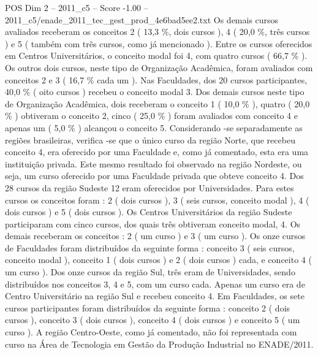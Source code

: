 \begin{textsample}{POS Dim 2 – 2011\_c5 – Score -1.00 – 2011\_c5/enade\_2011\_tec\_gest\_prod\_4e6bad5ee2.txt}
Os demais cursos avaliados receberam os conceitos 2 ( 13,3 \%, dois cursos ), 4 ( 20,0 \%, três cursos ) e 5 ( também com três cursos, como já mencionado ).
Entre os cursos oferecidos em Centros Universitários, o conceito modal foi 4, com quatro cursos ( 66,7 \% ).
Os outros dois cursos, neste tipo de Organização Acadêmica, foram avaliados com conceitos 2 e 3 ( 16,7 \% cada um ).
Nas Faculdades, dos 20 cursos participantes, 40,0 \% ( oito cursos ) recebeu o conceito modal 3.
Dos demais cursos neste tipo de Organização Acadêmica, dois receberam o conceito 1 ( 10,0 \% ), quatro ( 20,0 \% ) obtiveram o conceito 2, cinco ( 25,0 \% ) foram avaliados com conceito 4 e apenas um ( 5,0 \% ) alcançou o conceito 5.
Considerando -se separadamente as regiões brasileiras, verifica -se que o único curso da região Norte, que recebeu conceito 4, era oferecido por uma Faculdade e, como já comentado, esta era uma instituição privada.
Este mesmo resultado foi observado na região Nordeste, ou seja, um curso oferecido por uma Faculdade privada que obteve conceito 4.
Dos 28 cursos da região Sudeste 12 eram oferecidos por Universidades.
Para estes cursos os conceitos foram : 2 ( dois cursos ), 3 ( seis cursos, conceito modal ), 4 ( dois cursos ) e 5 ( dois cursos ).
Os Centros Universitários da região Sudeste participaram com cinco cursos, dos quais três obtiveram conceito modal, 4.
Os demais receberam os conceitos : 2 ( um curso ) e 3 ( um curso ).
Os onze cursos de Faculdades foram distribuídos da seguinte forma : conceito 3 ( seis cursos, conceito modal ), conceito 1 ( dois cursos ) e 2 ( dois cursos ) cada, e conceito 4 ( um curso ).
Dos onze cursos da região Sul, três eram de Universidades, sendo distribuídos nos conceitos 3, 4 e 5, com um curso cada.
Apenas um curso era de Centro Universitário na região Sul e recebeu conceito 4.
Em Faculdades, os sete cursos participantes foram distribuídos da seguinte forma : conceito 2 ( dois cursos ), conceito 3 ( dois cursos ), conceito 4 ( dois cursos ) e conceito 5 ( um curso ).
A região Centro-Oeste, como já comentado, não foi representada com curso na Área de Tecnologia em Gestão da Produção Industrial no ENADE/2011.

\end{textsample}
